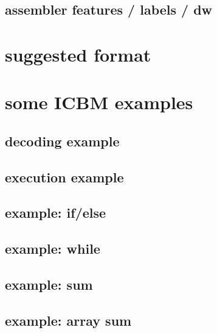 

\subsection{assembler features / labels / dw}



\section{suggested format}


\section{some ICBM examples}



\subsection{decoding example}


\subsection{execution example}


\subsection{example: if/else}



\subsection{example: while}



\subsection{example: sum}



\subsection{example: array sum}



